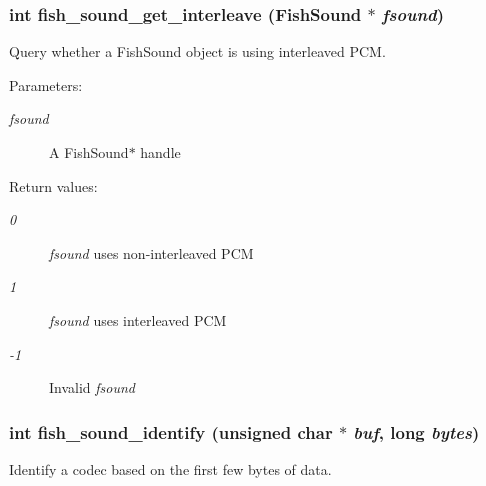 \subsubsection{\setlength{\rightskip}{0pt plus 5cm}int fish\_\-sound\_\-get\_\-interleave ({\bf Fish\-Sound} $\ast$ {\em fsound})}\label{fishsound_8h_a13}


Query whether a Fish\-Sound object is using interleaved PCM. 

\begin{Desc}
\item[Parameters:]
\begin{description}
\item[{\em fsound}]A Fish\-Sound$\ast$ handle \end{description}
\end{Desc}
\begin{Desc}
\item[Return values:]
\begin{description}
\item[{\em 0}]{\em fsound\/} uses non-interleaved PCM \item[{\em 1}]{\em fsound\/} uses interleaved PCM \item[{\em -1}]Invalid {\em fsound\/} \end{description}
\end{Desc}
\subsubsection{\setlength{\rightskip}{0pt plus 5cm}int fish\_\-sound\_\-identify (unsigned char $\ast$ {\em buf}, long {\em bytes})}\label{fishsound_8h_a3}


Identify a codec based on the first few bytes of data. 

